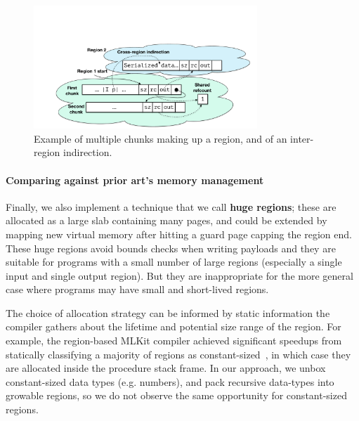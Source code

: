 \begin{figure}
  \vspace{-15mm}
  \begin{center}
    \includegraphics[width=0.75\textwidth]{region-memlayout2}
  \end{center}
  \vspace{-4mm}
  \caption{Example of multiple chunks making up a region, and of an inter-region
    indirection.  \captionscrunch{}}
  \label{fig:regions}
\end{figure}


\paragraph{Comparing against prior art's memory management}
Finally, we also implement a technique
that we call {\bf huge regions}; these are allocated as a large slab containing many
pages, and could be extended by mapping new virtual memory after hitting a guard
page capping the region end.
%
These huge regions avoid bounds checks when writing payloads and they are
suitable for programs with a small number of large regions (especially a single
input and single output region).  But they are inappropriate for the more
general case where programs may have small and short-lived regions.
%


The choice of allocation strategy can be informed by static information the
compiler gathers about the lifetime and potential size range of the region. For
example, the region-based MLKit compiler achieved significant speedups from
statically classifying a majority of regions as
constant-sized~\cite{mlkit-retrospective}, in which case they are allocated
inside the procedure stack frame.
%
In our approach, we unbox constant-sized data types (e.g. numbers), and
pack recursive data-types into growable regions, so we do not observe the same
opportunity for constant-sized regions.


